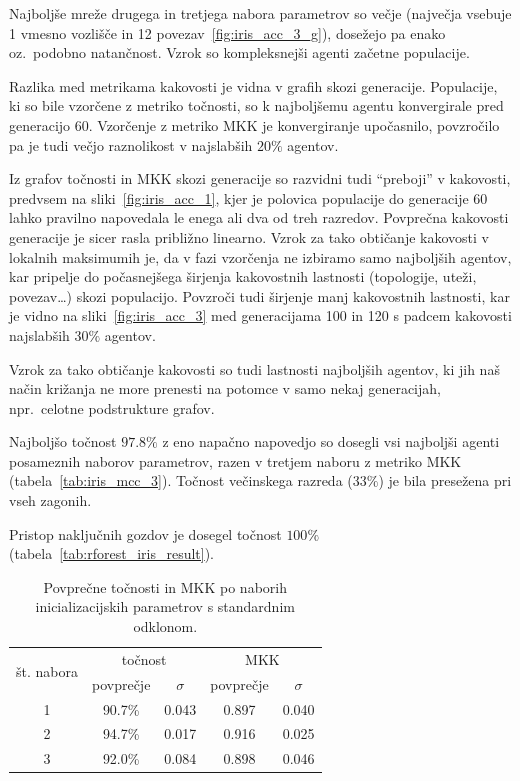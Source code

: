 \documentclass[a4paper,12pt,openright]{book}
\begin{document}
    Najboljše mreže drugega in tretjega nabora parametrov so večje (največja vsebuje 1 vmesno vozlišče in 12 povezav~\ref{fig:iris_acc_3_g}),
    dosežejo pa enako oz.\ podobno natančnost.
    Vzrok so kompleksnejši agenti začetne populacije.

    Razlika med metrikama kakovosti je vidna v grafih skozi generacije.
    Populacije, ki so bile vzorčene z metriko točnosti, so k najboljšemu agentu konvergirale pred generacijo 60.
    Vzorčenje z metriko MKK je konvergiranje upočasnilo, povzročilo pa je tudi večjo raznolikost v najslabših $20\%$ agentov.

    Iz grafov točnosti in MKK skozi generacije so razvidni tudi \enquote{preboji} v kakovosti, predvsem na sliki~\ref{fig:iris_acc_1},
    kjer je polovica populacije do generacije 60 lahko pravilno napovedala le enega ali dva od treh razredov.
    Povprečna kakovosti generacije je sicer rasla približno linearno.
    Vzrok za tako obtičanje kakovosti v lokalnih maksimumih je, da v fazi vzorčenja ne izbiramo samo najboljših agentov,
    kar pripelje do počasnejšega širjenja kakovostnih lastnosti (topologije, uteži, povezav\ldots) skozi populacijo.
    Povzroči tudi širjenje manj kakovostnih lastnosti, kar je vidno na sliki~\ref{fig:iris_acc_3} med generacijama 100 in
    120 s padcem kakovosti najslabših $30\%$ agentov.

    Vzrok za tako obtičanje kakovosti so tudi lastnosti najboljših agentov, ki jih naš način križanja ne more prenesti
    na potomce v samo nekaj generacijah, npr.\ celotne podstrukture grafov.

    Najboljšo točnost $97.8\%$ z eno napačno napovedjo so dosegli vsi najboljši agenti posameznih naborov parametrov, razen v tretjem naboru z
    metriko MKK (tabela~\ref{tab:iris_mcc_3}).
    Točnost večinskega razreda ($33\%$) je bila presežena pri vseh zagonih.

    Pristop naključnih gozdov je dosegel točnost $100\%$ (tabela~\ref{tab:rforest_iris_result}).

    \begin{table}[H]
        \begin{center}
            \begin{tabular}{|| c | c c || c c ||}
                \hline
                \multirow{2}{*}{št. nabora} & \multicolumn{2}{c||}{točnost} & \multicolumn{2}{c||}{MKK} \\ \cline{2-5}
                & povprečje & $\sigma$ & povprečje & $\sigma$ \\
                \hline
                1 & 90.7\%    & 0.043   & 0.897     & 0.040    \\
                2 & 94.7\%    & 0.017   & 0.916     & 0.025    \\
                3 & 92.0\%    & 0.084   & 0.898     & 0.046    \\
                \hline
            \end{tabular}
        \end{center}
        \caption{Povprečne točnosti in MKK po naborih inicializacijskih parametrov s standardnim odklonom.}
        \label{tab:iris_result_aggregate}
    \end{table}
\end{document}
